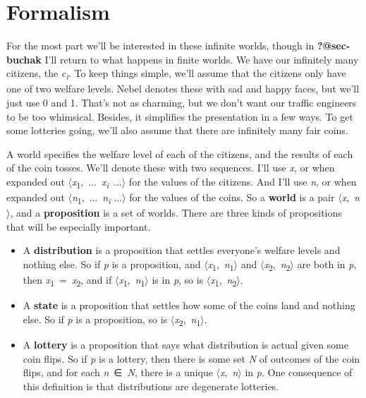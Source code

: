 \documentclass[
  11pt,
  letterpaper,
  DIV=11,
  numbers=noendperiod,
  twoside]{scrartcl}
\providecommand{\tightlist}{%
  \setlength{\itemsep}{0pt}\setlength{\parskip}{0pt}}
\begin{document}
\section{Formalism}\label{sec-formalism}

For the most part we'll be interested in these infinite worlds, though
in \textbf{?@sec-buchak} I'll return to what happens in finite worlds.
We have our infinitely many citizens, the \emph{c\textsubscript{i}}. To
keep things simple, we'll assume that the citizens only have one of two
welfare levels. Nebel denotes these with sad and happy faces, but we'll
just use 0 and 1. That's not as charming, but we don't want our traffic
engineers to be too whimsical. Besides, it simplifies the presentation
in a few ways. To get some lotteries going, we'll also assume that there
are infinitely many fair coins.

A world specifies the welfare level of each of the citizens, and the
results of each of the coin tosses. We'll denote these with two
sequences. I'll use \emph{x}, or when expanded out
\(\langle\)\emph{x}\textsubscript{1},~\(\ldots\)~\emph{x\textsubscript{i}}~\(\ldots \rangle\)
for the values of the citizens. And I'll use \emph{n}, or when expanded
out
\(\langle\)\emph{n}\textsubscript{1},~\(\ldots\)~\emph{n\textsubscript{i}}
\(\ldots \rangle\) for the values of the coins. So a \textbf{world} is a
pair \(\langle\)\emph{x},~\emph{n}\(\rangle\), and a
\textbf{proposition} is a set of worlds. There are three kinds of
propositions that will be especially important.

\begin{itemize}
\tightlist
\item
  A \textbf{distribution} is a proposition that settles everyone's
  welfare levels and nothing else. So if \emph{p} is a proposition, and
  \(\langle\)\emph{x}\textsubscript{1},~\emph{n}\textsubscript{1}\(\rangle\)
  and
  \(\langle\)\emph{x}\textsubscript{2},~\emph{n}\textsubscript{2}\(\rangle\)
  are both in \emph{p}, then
  \emph{x}\textsubscript{1}~=~\emph{x}\textsubscript{2}, and if
  \(\langle\)\emph{x}\textsubscript{1},~\emph{n}\textsubscript{1}\(\rangle\)
  is in \emph{p}, so is
  \(\langle\)\emph{x}\textsubscript{1},~\emph{n}\textsubscript{2}\(\rangle\).
\item
  A \textbf{state} is a proposition that settles how some of the coins
  land and nothing else. So if \emph{p} is a proposition, so is
  \(\langle\)\emph{x}\textsubscript{2},~\emph{n}\textsubscript{1}\(\rangle\).
\item
  A \textbf{lottery} is a proposition that says what distribution is
  actual given some coin flips. So if \emph{p} is a lottery, then there
  is some set \emph{N} of outcomes of the coin flips, and for each
  \emph{n}~∈~\emph{N}, there is a unique
  \(\langle\)\emph{x},~\emph{n}\(\rangle\) in \emph{p}. One consequence
  of this definition is that distributions are degenerate lotteries.
\end{itemize}
\end{document}
